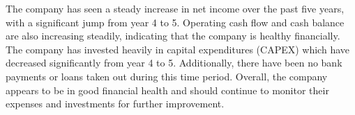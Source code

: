 

The company has seen a steady increase in net income over the past five years, with a significant jump from year 4 to 5. Operating cash flow and cash balance are also increasing steadily, indicating that the company is healthy financially. The company has invested heavily in capital expenditures (CAPEX) which have decreased significantly from year 4 to 5. Additionally, there have been no bank payments or loans taken out during this time period. Overall, the company appears to be in good financial health and should continue to monitor their expenses and investments for further improvement.